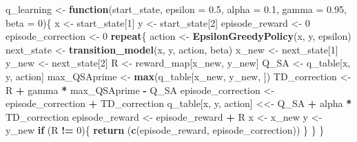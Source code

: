 \documentclass[
]{article}
\newenvironment{Shaded}{\begin{snugshade}}{\end{snugshade}}
\newcommand{\AttributeTok}[1]{\textcolor[rgb]{0.13,0.29,0.53}{#1}}
\newcommand{\ControlFlowTok}[1]{\textcolor[rgb]{0.13,0.29,0.53}{\textbf{#1}}}
\newcommand{\DecValTok}[1]{\textcolor[rgb]{0.00,0.00,0.81}{#1}}
\newcommand{\FloatTok}[1]{\textcolor[rgb]{0.00,0.00,0.81}{#1}}
\newcommand{\FunctionTok}[1]{\textcolor[rgb]{0.13,0.29,0.53}{\textbf{#1}}}
\newcommand{\NormalTok}[1]{#1}
\newcommand{\OtherTok}[1]{\textcolor[rgb]{0.56,0.35,0.01}{#1}}
\newcommand{\SpecialCharTok}[1]{\textcolor[rgb]{0.81,0.36,0.00}{\textbf{#1}}}
\begin{document}
\begin{Shaded}
\begin{Highlighting}[]
\NormalTok{q\_learning }\OtherTok{\textless{}{-}} \ControlFlowTok{function}\NormalTok{(start\_state, }\AttributeTok{epsilon =} \FloatTok{0.5}\NormalTok{, }\AttributeTok{alpha =} \FloatTok{0.1}\NormalTok{, }\AttributeTok{gamma =} \FloatTok{0.95}\NormalTok{, }\AttributeTok{beta =} \DecValTok{0}\NormalTok{)\{}
\NormalTok{  x }\OtherTok{\textless{}{-}}\NormalTok{ start\_state[}\DecValTok{1}\NormalTok{]}
\NormalTok{  y }\OtherTok{\textless{}{-}}\NormalTok{ start\_state[}\DecValTok{2}\NormalTok{]}
\NormalTok{  episode\_reward }\OtherTok{\textless{}{-}} \DecValTok{0}
\NormalTok{  episode\_correction }\OtherTok{\textless{}{-}} \DecValTok{0}
  \ControlFlowTok{repeat}\NormalTok{\{}
\NormalTok{    action }\OtherTok{\textless{}{-}} \FunctionTok{EpsilonGreedyPolicy}\NormalTok{(x, y, epsilon)}
\NormalTok{    next\_state }\OtherTok{\textless{}{-}} \FunctionTok{transition\_model}\NormalTok{(x, y, action, beta)}
\NormalTok{    x\_new }\OtherTok{\textless{}{-}}\NormalTok{ next\_state[}\DecValTok{1}\NormalTok{]}
\NormalTok{    y\_new }\OtherTok{\textless{}{-}}\NormalTok{ next\_state[}\DecValTok{2}\NormalTok{]}
\NormalTok{    R }\OtherTok{\textless{}{-}}\NormalTok{ reward\_map[x\_new, y\_new]}
\NormalTok{    Q\_SA }\OtherTok{\textless{}{-}}\NormalTok{ q\_table[x, y, action]}
\NormalTok{    max\_QSAprime }\OtherTok{\textless{}{-}} \FunctionTok{max}\NormalTok{(q\_table[x\_new, y\_new, ])}
\NormalTok{    TD\_correction }\OtherTok{\textless{}{-}}\NormalTok{ R }\SpecialCharTok{+}\NormalTok{ gamma }\SpecialCharTok{*}\NormalTok{ max\_QSAprime }\SpecialCharTok{{-}}\NormalTok{ Q\_SA}
\NormalTok{    episode\_correction }\OtherTok{\textless{}{-}}\NormalTok{ episode\_correction }\SpecialCharTok{+}\NormalTok{ TD\_correction}
\NormalTok{    q\_table[x, y, action] }\OtherTok{\textless{}\textless{}{-}}\NormalTok{ Q\_SA }\SpecialCharTok{+}\NormalTok{ alpha }\SpecialCharTok{*}\NormalTok{ TD\_correction}
\NormalTok{    episode\_reward }\OtherTok{\textless{}{-}}\NormalTok{ episode\_reward }\SpecialCharTok{+}\NormalTok{ R}
\NormalTok{    x }\OtherTok{\textless{}{-}}\NormalTok{ x\_new}
\NormalTok{    y }\OtherTok{\textless{}{-}}\NormalTok{ y\_new}
    \ControlFlowTok{if}\NormalTok{ (R }\SpecialCharTok{!=} \DecValTok{0}\NormalTok{)\{}
      \FunctionTok{return}\NormalTok{ (}\FunctionTok{c}\NormalTok{(episode\_reward, episode\_correction))}
\NormalTok{    \}}
\NormalTok{  \}}
\NormalTok{\}}
\end{Highlighting}
\end{Shaded}
\end{document}
